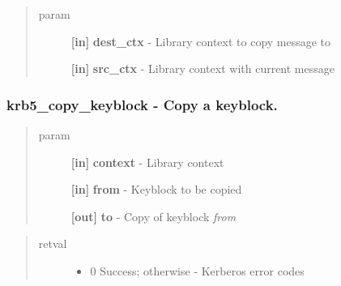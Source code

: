 \documentclass[letterpaper,10pt,english]{sphinxmanual}
\begin{document}
\begin{fulllineitems}
\label{appdev/refs/api/krb5_copy_error_message:krb5_copy_error_message}
\end{fulllineitems}

\begin{quote}\begin{description}
\item[{param}] \leavevmode
\textbf{{[}in{]}} \textbf{dest\_ctx} - Library context to copy message to

\textbf{{[}in{]}} \textbf{src\_ctx} - Library context with current message

\end{description}\end{quote}


\subsubsection{krb5\_copy\_keyblock -  Copy a keyblock.}
\label{appdev/refs/api/krb5_copy_keyblock:krb5-copy-keyblock-copy-a-keyblock}\label{appdev/refs/api/krb5_copy_keyblock::doc}

\begin{fulllineitems}
\label{appdev/refs/api/krb5_copy_keyblock:krb5_copy_keyblock}
\end{fulllineitems}

\begin{quote}\begin{description}
\item[{param}] \leavevmode
\textbf{{[}in{]}} \textbf{context} - Library context

\textbf{{[}in{]}} \textbf{from} - Keyblock to be copied

\textbf{{[}out{]}} \textbf{to} - Copy of keyblock \emph{from}

\end{description}\end{quote}
\begin{quote}\begin{description}
\item[{retval}] \leavevmode\begin{itemize}
\item {} 
0   Success; otherwise - Kerberos error codes

\end{itemize}

\end{description}\end{quote}
\end{document}
